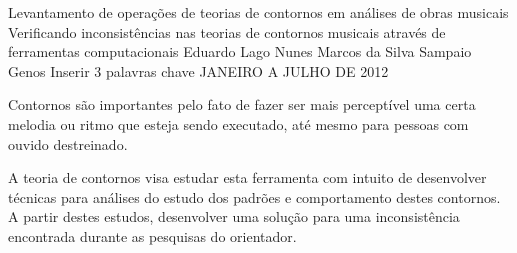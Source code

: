 \documentclass[11pt]{article}
\begin{document}
\graphicspath{{figs/}}


\dadosRelatorioFinal
{Levantamento de operações de teorias de contornos em análises de
  obras musicais}
{Verificando inconsistências nas teorias de contornos musicais através
  de ferramentas computacionais }
{Eduardo Lago Nunes}
{Marcos da Silva Sampaio}
{Genos}
{Inserir 3 palavras chave}
{JANEIRO A JULHO DE 2012}


\newpage

\setcounter{page}{1}
\onehalfspace






\label{sec:introducao}

Contornos são importantes pelo fato de fazer ser mais perceptível uma
certa melodia ou ritmo que esteja sendo executado, até mesmo para
pessoas com ouvido destreinado.


A teoria de contornos visa estudar esta ferramenta com intuito de
desenvolver técnicas para análises do estudo dos padrões e
comportamento destes contornos.
A partir destes estudos, desenvolver uma solução para uma
inconsistência encontrada durante as pesquisas do orientador.
\end{document}
